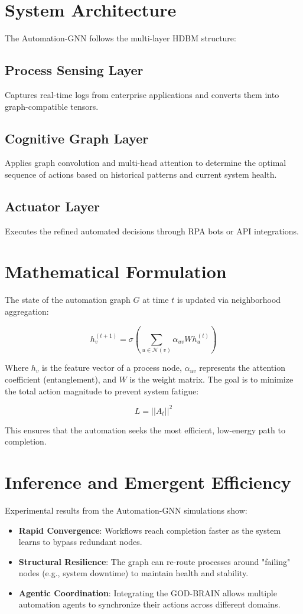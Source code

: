 \documentclass[12pt]{article}
\begin{document}
\section{System Architecture}

The Automation-GNN follows the multi-layer HDBM structure:

\subsection{Process Sensing Layer}
Captures real-time logs from enterprise applications and converts them into graph-compatible tensors.

\subsection{Cognitive Graph Layer}
Applies graph convolution and multi-head attention to determine the optimal sequence of actions based on historical patterns and current system health.

\subsection{Actuator Layer}
Executes the refined automated decisions through RPA bots or API integrations.

\section{Mathematical Formulation}

The state of the automation graph $G$ at time $t$ is updated via neighborhood aggregation:

\[
h_v^{(t+1)} = \sigma \left( \sum_{u \in \mathcal{N}(v)} \alpha_{uv} W h_u^{(t)} \right)
\]

Where $h_v$ is the feature vector of a process node, $\alpha_{uv}$ represents the attention coefficient (entanglement), and $W$ is the weight matrix. The goal is to minimize the total action magnitude to prevent system fatigue:

\[
L = ||A_t||^2
\]

This ensures that the automation seeks the most efficient, low-energy path to completion.

\section{Inference and Emergent Efficiency}

Experimental results from the Automation-GNN simulations show:
\begin{itemize}
\item \textbf{Rapid Convergence}: Workflows reach completion faster as the system learns to bypass redundant nodes.
\item \textbf{Structural Resilience}: The graph can re-route processes around "failing" nodes (e.g., system downtime) to maintain health and stability.
\item \textbf{Agentic Coordination}: Integrating the GOD-BRAIN allows multiple automation agents to synchronize their actions across different domains.
\end{itemize}
\end{document}
